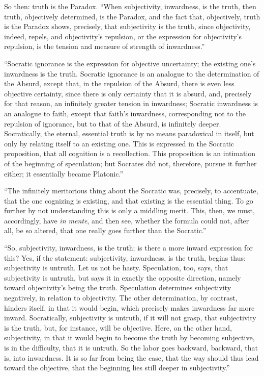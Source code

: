 \documentclass[12pt]{book}
\begin{document}
So then: truth is the Paradox. ``When subjectivity, inwardness, is the truth, then truth,
objectively determined, is the Paradox, and the fact that, objectively, truth is the Paradox shows, precisely, that subjectivity is the truth, since objectivity, indeed, repels, and objectivity's repulsion, or the expression for objectivity's repulsion, is the tension and measure of strength of inwardness.''

``Socratic ignorance is the expression for objective uncertainty; the existing one's inwardness is the truth. Socratic ignorance is an analogue to the determination of the Absurd, except that, in the repulsion of the Absurd, there is even less objective certainty, since there is only certainty that it is absurd, and, precisely for that reason, an infinitely greater tension in inwardness; Socratic inwardness is an analogue to faith, except that faith's inwardness, corresponding not to the repulsion of ignorance, but to that of the Absurd, is infinitely deeper. Socratically, the eternal, essential truth is by no means paradoxical in itself, but only by relating itself to an existing one. This is expressed in the Socratic proposition, that all cognition is a recollection. This proposition is an intimation of the beginning of speculation; but Socrates did not, therefore, pursue it further either; it essentially became Platonic.''

``The infinitely meritorious thing about the Socratic was, precisely, to accentuate, that the one cognizing is existing, and that existing is the essential thing. To go further by not understanding this is only a middling merit. This, then, we must, accordingly, have \textit{in mente}, and then see, whether the formula could not, after all, be so altered, that one really goes further than the Socratic.''

``So, subjectivity, inwardness, is the truth; is there a more inward expression for this? Yes, if the statement: subjectivity, inwardness, is the truth, begins thus: subjectivity is untruth. Let us not be hasty. Speculation, too, says, that subjectivity is untruth, but says it in exactly the opposite direction, namely toward objectivity's being the truth. Speculation determines subjectivity negatively, in relation to objectivity. The other determination, by contrast, hinders itself, in that it would begin, which precisely makes inwardness far more inward. Socratically, subjectivity is untruth, if it will not grasp, that subjectivity is the truth, but, for instance, will be objective. Here, on the other hand, subjectivity, in that it would begin to become the truth by becoming subjective, is in the difficulty, that it is untruth. So the labor goes backward, backward, that is, into inwardness. It is so far from being the case, that the way should thus lead toward the objective, that the beginning lies still deeper in subjectivity.''
\end{document}
